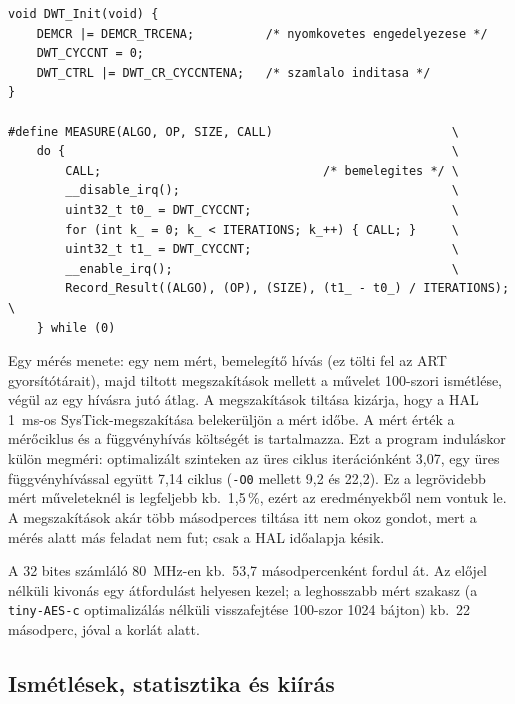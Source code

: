 \documentclass[a4paper,12pt]{report}
\theoremstyle{definition}
\theoremstyle{remark}
\begin{document}
\noindent\begin{minipage}{\textwidth}
\begin{verbatim}
void DWT_Init(void) {
    DEMCR |= DEMCR_TRCENA;          /* nyomkovetes engedelyezese */
    DWT_CYCCNT = 0;
    DWT_CTRL |= DWT_CR_CYCCNTENA;   /* szamlalo inditasa */
}

#define MEASURE(ALGO, OP, SIZE, CALL)                         \
    do {                                                      \
        CALL;                               /* bemelegites */ \
        __disable_irq();                                      \
        uint32_t t0_ = DWT_CYCCNT;                            \
        for (int k_ = 0; k_ < ITERATIONS; k_++) { CALL; }     \
        uint32_t t1_ = DWT_CYCCNT;                            \
        __enable_irq();                                       \
        Record_Result((ALGO), (OP), (SIZE), (t1_ - t0_) / ITERATIONS); \
    } while (0)
\end{verbatim}
\label{lst:dwt}
\end{minipage}

\medskip

Egy mérés menete: egy nem mért, bemelegítő hívás (ez tölti fel az ART gyorsítótárait), majd tiltott megszakítások mellett a művelet 100-szori ismétlése, végül az egy hívásra jutó átlag. A megszakítások tiltása kizárja, hogy a HAL 1~ms-os SysTick-megszakítása belekerüljön a mért időbe. A mért érték a mérőciklus és a függvényhívás költségét is tartalmazza. Ezt a program induláskor külön megméri: optimalizált szinteken az üres ciklus iterációnként 3,07, egy üres függvényhívással együtt 7,14 ciklus (\texttt{-O0} mellett 9,2 és 22,2). Ez a legrövidebb mért műveleteknél is legfeljebb kb.\ 1,5\,\%, ezért az eredményekből nem vontuk le. A megszakítások akár több másodperces tiltása itt nem okoz gondot, mert a mérés alatt más feladat nem fut; csak a HAL időalapja késik.

A 32 bites számláló 80~MHz-en kb.\ 53,7 másodpercenként fordul át. Az előjel nélküli kivonás egy átfordulást helyesen kezel; a leghosszabb mért szakasz (a \texttt{tiny-AES-c} optimalizálás nélküli visszafejtése 100-szor 1024 bájton) kb.\ 22 másodperc, jóval a korlát alatt.

\subsection{Ismétlések, statisztika és kiírás}
\end{document}
